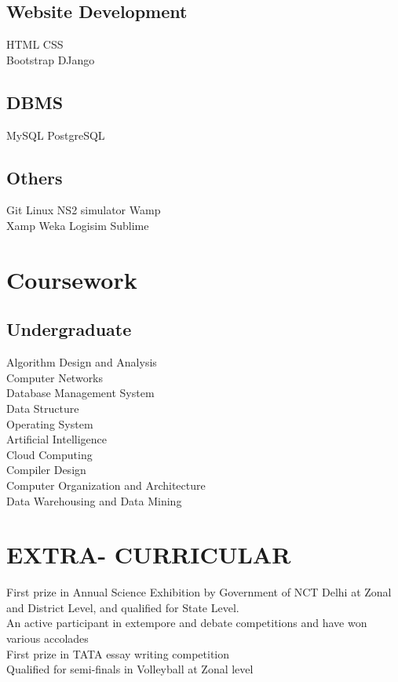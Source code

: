 \documentclass[]{resume-openfont}
\begin{document}
\begin{minipage}[t]{0.28\textwidth}
\subsection{Website Development}
HTML \textbullet{} CSS \\
Bootstrap \textbullet{} DJango
\sectionsep
\subsection{DBMS}
MySQL \textbullet{} PostgreSQL
\sectionsep
\subsection{Others}
Git \textbullet{} Linux \textbullet{} NS2 simulator \textbullet{} Wamp \\ \textbullet{} Xamp \textbullet{} Weka \textbullet{} Logisim \textbullet{} Sublime 
\sectionsep


\section{Coursework}
\subsection{Undergraduate}
Algorithm Design and Analysis \\
Computer Networks \\
Database Management System \\
Data Structure \\
Operating System \\
Artificial Intelligence \\
Cloud Computing \\
Compiler Design \\
Computer Organization and Architecture \\
Data Warehousing and Data Mining 
\sectionsep


\section{EXTRA- CURRICULAR}
\textbullet{} First prize in Annual Science Exhibition by Government of NCT Delhi at Zonal and District Level, and qualified for State Level. \\
\textbullet{} An active participant in extempore and debate competitions and have won various accolades \\
\textbullet{} First prize in TATA essay writing competition \\
\textbullet{} Qualified for semi-finals in Volleyball at Zonal level
\sectionsep


\end{minipage}
\end{document}
